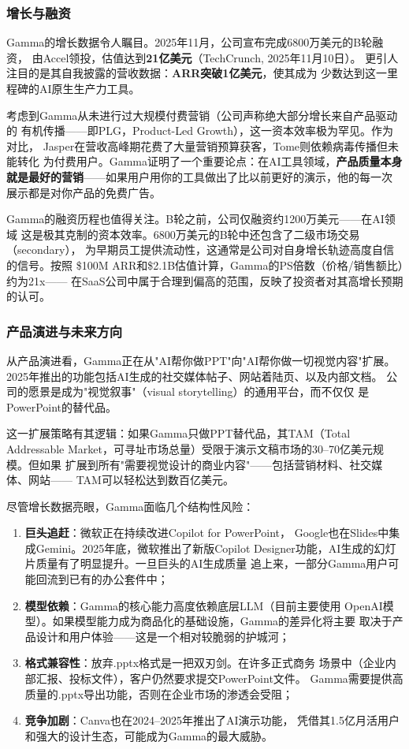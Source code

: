\subsubsection{增长与融资}
Gamma的增长数据令人瞩目。2025年11月，公司宣布完成6800万美元的B轮融资，
由Accel领投，估值达到\textbf{21亿美元}（TechCrunch, 2025年11月10日）。
更引人注目的是其自我披露的营收数据：\textbf{ARR突破1亿美元}，使其成为
少数达到这一里程碑的AI原生生产力工具。

考虑到Gamma从未进行过大规模付费营销（公司声称绝大部分增长来自产品驱动的
有机传播——即PLG，Product-Led Growth），这一资本效率极为罕见。作为对比，
Jasper在营收高峰期花费了大量营销预算获客，Tome则依赖病毒传播但未能转化
为付费用户。Gamma证明了一个重要论点：在AI工具领域，\textbf{产品质量本身
就是最好的营销}——如果用户用你的工具做出了比以前更好的演示，他的每一次
展示都是对你产品的免费广告。

Gamma的融资历程也值得关注。B轮之前，公司仅融资约1200万美元——在AI领域
这是极其克制的资本效率。6800万美元的B轮中还包含了二级市场交易（secondary），
为早期员工提供流动性，这通常是公司对自身增长轨迹高度自信的信号。按照
\$100M ARR和\$2.1B估值计算，Gamma的PS倍数（价格/销售额比）约为21x——
在SaaS公司中属于合理到偏高的范围，反映了投资者对其高增长预期的认可。

\subsubsection{产品演进与未来方向}
从产品演进看，Gamma正在从"AI帮你做PPT"向"AI帮你做一切视觉内容"扩展。
2025年推出的功能包括AI生成的社交媒体帖子、网站着陆页、以及内部文档。
公司的愿景是成为"视觉叙事"（visual storytelling）的通用平台，而不仅仅
是PowerPoint的替代品。

这一扩展策略有其逻辑：如果Gamma只做PPT替代品，其TAM（Total Addressable
Market，可寻址市场总量）受限于演示文稿市场的30--70亿美元规模。但如果
扩展到所有"需要视觉设计的商业内容"——包括营销材料、社交媒体、网站——
TAM可以轻松达到数百亿美元。

\begin{warnbox}
尽管增长数据亮眼，Gamma面临几个结构性风险：
\begin{enumerate}
  \item \textbf{巨头追赶}：微软正在持续改进Copilot for PowerPoint，
    Google也在Slides中集成Gemini。2025年底，微软推出了新版Copilot
    Designer功能，AI生成的幻灯片质量有了明显提升。一旦巨头的AI生成质量
    追上来，一部分Gamma用户可能回流到已有的办公套件中；
  \item \textbf{模型依赖}：Gamma的核心能力高度依赖底层LLM（目前主要使用
    OpenAI模型）。如果模型能力成为商品化的基础设施，Gamma的差异化将主要
    取决于产品设计和用户体验——这是一个相对较脆弱的护城河；
  \item \textbf{格式兼容性}：放弃.pptx格式是一把双刃剑。在许多正式商务
    场景中（企业内部汇报、投标文件），客户仍然要求提交PowerPoint文件。
    Gamma需要提供高质量的.pptx导出功能，否则在企业市场的渗透会受阻；
  \item \textbf{竞争加剧}：Canva也在2024--2025年推出了AI演示功能，
    凭借其1.5亿月活用户和强大的设计生态，可能成为Gamma的最大威胁。
\end{enumerate}
\end{warnbox}

